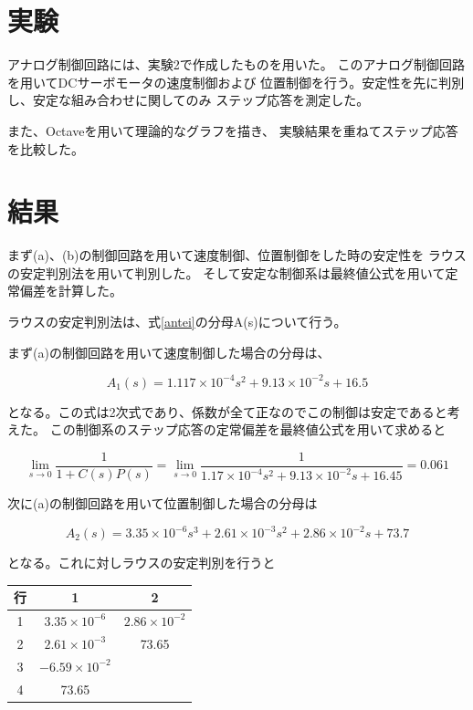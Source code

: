 \documentclass[uplatex, 11pt,a4j, titlepage]{jsarticle}
\begin{document}
\section{実験}

アナログ制御回路には、実験2で作成したものを用いた。
このアナログ制御回路を用いてDCサーボモータの速度制御および
位置制御を行う。安定性を先に判別し、安定な組み合わせに関してのみ
ステップ応答を測定した。

また、Octaveを用いて理論的なグラフを描き、
実験結果を重ねてステップ応答を比較した。

\section{結果}

まず(a)、(b)の制御回路を用いて速度制御、位置制御をした時の安定性を
ラウスの安定判別法を用いて判別した。
そして安定な制御系は最終値公式を用いて定常偏差を計算した。

ラウスの安定判別法は、式\ref{antei}の分母A(s)について行う。

まず(a)の制御回路を用いて速度制御した場合の分母は、

\begin{equation}
    A_1(s) = 1.117\times10^{-4}s^2 + 9.13\times10^{-2} s + 16.5
\end{equation}

となる。この式は2次式であり、係数が全て正なのでこの制御は安定であると考えた。
この制御系のステップ応答の定常偏差を最終値公式を用いて求めると

\begin{equation}
    \lim_{s \to 0} \frac{1}{1 + C(s)P(s)} = 
        \lim_{s \to 0} \frac{1}{1.17\times10^{-4}s^2 + 9.13\times10^{-2}s + 16.45}
            = 0.061
\end{equation}

次に(a)の制御回路を用いて位置制御した場合の分母は

\begin{equation}
    A_2(s) = 3.35\times10^{-6}s^3 + 2.61\times10^{-3}s^2 
        + 2.86\times10^{-2}s + 73.7
\end{equation}

となる。これに対しラウスの安定判別を行うと

\begin{table}[h]
    \centering
    \begin{tabular}{|c||c|c|} \hline
        行 & 1 & 2 \\ \hline \hline
        1 & $3.35\times10^{-6}$ & $2.86\times10^{-2}$ \\ \hline
        2 & $2.61\times10^{-3}$ & 73.65 \\ \hline
        3 & $-6.59\times10^{-2}$ & \  \\ \hline
        4 & 73.65 & \  \\ \hline
    \end{tabular}
\end{table}
\end{document}
